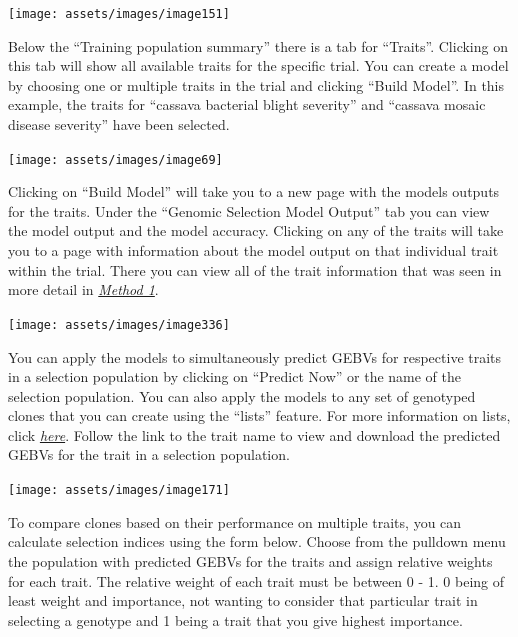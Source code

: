 \documentclass[
  12pt,
]{book}
\begin{document}
\begin{center}\texttt{[image: assets/images/image151]} \end{center}

Below the ``Training population summary'' there is a tab for ``Traits''. Clicking on this tab will show all available traits for the specific trial. You can create a model by choosing one or multiple traits in the trial and clicking ``Build Model''. In this example, the traits for ``cassava bacterial blight severity'' and ``cassava mosaic disease severity'' have been selected.

\begin{center}\texttt{[image: assets/images/image69]} \end{center}

Clicking on ``Build Model'' will take you to a new page with the models outputs for the traits. Under the ``Genomic Selection Model Output'' tab you can view the model output and the model accuracy. Clicking on any of the traits will take you to a page with information about the model output on that individual trait within the trial. There you can view all of the trait information that was seen in more detail in \protect\hyperlink{method-1}{\emph{Method 1}}.

\begin{center}\texttt{[image: assets/images/image336]} \end{center}

You can apply the models to simultaneously predict GEBVs for respective traits in a selection population by clicking on ``Predict Now'' or the name of the selection population. You can also apply the models to any set of genotyped clones that you can create using the ``lists'' feature. For more information on lists, click \protect\hyperlink{working-with-lists}{\emph{here}}. Follow the link to the trait name to view and download the predicted GEBVs for the trait in a selection population.

\begin{center}\texttt{[image: assets/images/image171]} \end{center}

To compare clones based on their performance on multiple traits, you can calculate selection indices using the form below. Choose from the pulldown menu the population with predicted GEBVs for the traits and assign relative weights for each trait. The relative weight of each trait must be between 0 - 1. 0 being of least weight and importance, not wanting to consider that particular trait in selecting a genotype and 1 being a trait that you give highest importance.
\end{document}
